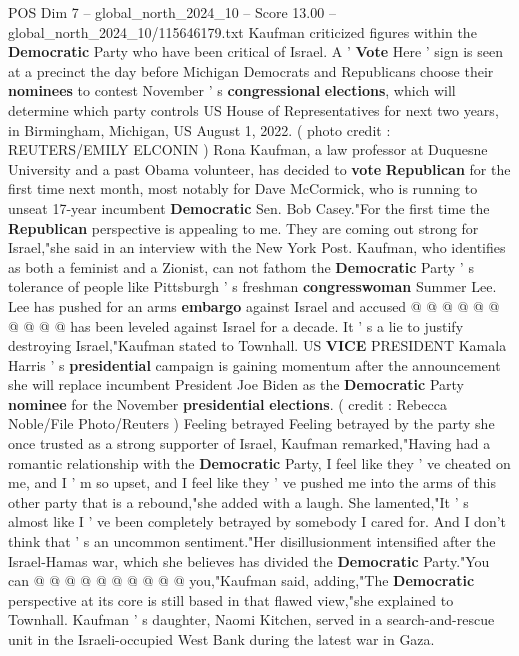 \begin{textsample}{POS Dim 7 – global\_north\_2024\_10 – Score 13.00 – global\_north\_2024\_10/115646179.txt}  \label{ex:f7_pos_092}
Kaufman criticized figures within the \textbf{Democratic} Party who have been critical of Israel.
A ' \textbf{Vote} Here ' sign is seen at a precinct the day before Michigan Democrats and Republicans choose their \textbf{nominees} to contest November ' s \textbf{congressional} \textbf{elections}, which will determine which party controls US House of Representatives for next two years, in Birmingham, Michigan, US August 1, 2022. ( photo credit : REUTERS/EMILY ELCONIN ) Rona Kaufman, a law professor at Duquesne University and a past Obama volunteer, has decided to \textbf{vote} \textbf{Republican} for the first time next month, most notably for Dave McCormick, who is running to unseat 17-year incumbent \textbf{Democratic} Sen.
Bob Casey."For the first time the \textbf{Republican} perspective is appealing to me.
They are coming out strong for Israel,"she said in an interview with the New York Post.
Kaufman, who identifies as both a feminist and a Zionist, can not fathom the \textbf{Democratic} Party ' s tolerance of people like Pittsburgh ' s freshman \textbf{congresswoman} Summer Lee.
Lee has pushed for an arms \textbf{embargo} against Israel and accused @ @ @ @ @ @ @ @ @ @ has been leveled against Israel for a decade.
It ' s a lie to justify destroying Israel,"Kaufman stated to Townhall.
US \textbf{VICE} PRESIDENT Kamala Harris ' s \textbf{presidential} campaign is gaining momentum after the announcement she will replace incumbent President Joe Biden as the \textbf{Democratic} Party \textbf{nominee} for the November \textbf{presidential} \textbf{elections}. ( credit : Rebecca Noble/File Photo/Reuters ) Feeling betrayed Feeling betrayed by the party she once trusted as a strong supporter of Israel, Kaufman remarked,"Having had a romantic relationship with the \textbf{Democratic} Party, I feel like they ' ve cheated on me, and I ' m so upset, and I feel like they ' ve pushed me into the arms of this other party that is a rebound,"she added with a laugh.
She lamented,"It ' s almost like I ' ve been completely betrayed by somebody I cared for.
And I don't think that ' s an uncommon sentiment."Her disillusionment intensified after the Israel-Hamas war, which she believes has divided the \textbf{Democratic} Party."You can @ @ @ @ @ @ @ @ @ @ you,"Kaufman said, adding,"The \textbf{Democratic} perspective at its core is still based in that flawed view,"she explained to Townhall.
Kaufman ' s daughter, Naomi Kitchen, served in a search-and-rescue unit in the Israeli-occupied West Bank during the latest war in Gaza.

\end{textsample}
